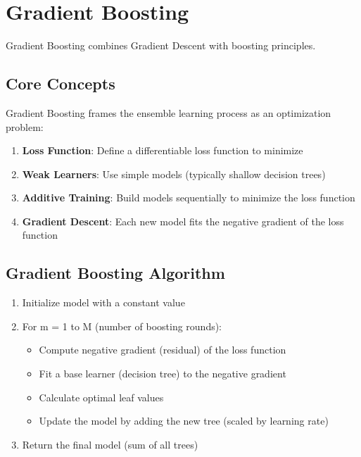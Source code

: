 \documentclass[
  letterpaper,
  DIV=11,
  numbers=noendperiod]{scrreprt}
\providecommand{\tightlist}{%
  \setlength{\itemsep}{0pt}\setlength{\parskip}{0pt}}\usepackage{longtable,booktabs,array}
\begin{document}
\section{Gradient Boosting}\label{gradient-boosting}

Gradient Boosting combines Gradient Descent with boosting principles.

\subsection{Core Concepts}\label{core-concepts-2}

Gradient Boosting frames the ensemble learning process as an
optimization problem:

\begin{enumerate}
\def\labelenumi{\arabic{enumi}.}
\tightlist
\item
  \textbf{Loss Function}: Define a differentiable loss function to
  minimize
\item
  \textbf{Weak Learners}: Use simple models (typically shallow decision
  trees)
\item
  \textbf{Additive Training}: Build models sequentially to minimize the
  loss function
\item
  \textbf{Gradient Descent}: Each new model fits the negative gradient
  of the loss function
\end{enumerate}

\subsection{Gradient Boosting
Algorithm}\label{gradient-boosting-algorithm}

\begin{enumerate}
\def\labelenumi{\arabic{enumi}.}
\tightlist
\item
  Initialize model with a constant value
\item
  For m = 1 to M (number of boosting rounds):

  \begin{itemize}
  \tightlist
  \item
    Compute negative gradient (residual) of the loss function
  \item
    Fit a base learner (decision tree) to the negative gradient
  \item
    Calculate optimal leaf values
  \item
    Update the model by adding the new tree (scaled by learning rate)
  \end{itemize}
\item
  Return the final model (sum of all trees)
\end{enumerate}
\end{document}
